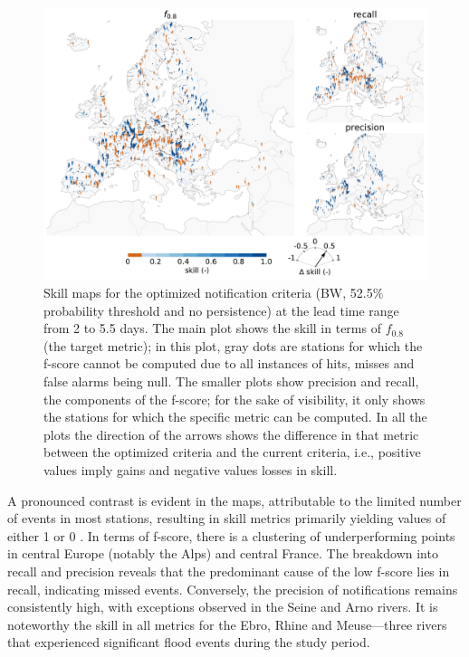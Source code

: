 \documentclass[preprint,12pt,authoryear]{elsarticle}
\begin{document}
\begin{figure}
    \centering
    \includegraphics[width=1\linewidth]{figures/skill_maps_reporting_points_2000km2_1239points_brier_weighted_060h_arrows.pdf}
    \caption{Skill maps for the optimized notification criteria (BW, 52.5\% probability threshold and no persistence) at the lead time range from 2 to 5.5 days. The main plot shows the skill in terms of $f_{0.8}$ (the target metric); in this plot, gray dots are stations for which the f-score cannot be computed due to all instances of hits, misses and false alarms being null. The smaller plots show precision and recall, the components of the f-score; for the sake of visibility, it only shows the stations for which the specific metric can be computed. In all the plots the direction of the arrows shows the difference in that metric between the optimized criteria and the current criteria, i.e., positive values imply gains and negative values losses in skill.}
    \label{fig:maps_BW}
\end{figure}

A pronounced contrast is evident in the maps, attributable to the limited number of events in most stations, resulting in skill metrics primarily yielding values of either 1 or 0 . In terms of f-score, there is a clustering of underperforming points in central Europe (notably the Alps) and central France. The breakdown into recall and precision reveals that the predominant cause of the low f-score lies in recall, indicating missed events. Conversely, the precision of notifications remains consistently high, with exceptions observed in the Seine and Arno rivers. It is noteworthy the skill in all metrics for the Ebro, Rhine and Meuse—three rivers that experienced significant flood events during the study period.
\end{document}
